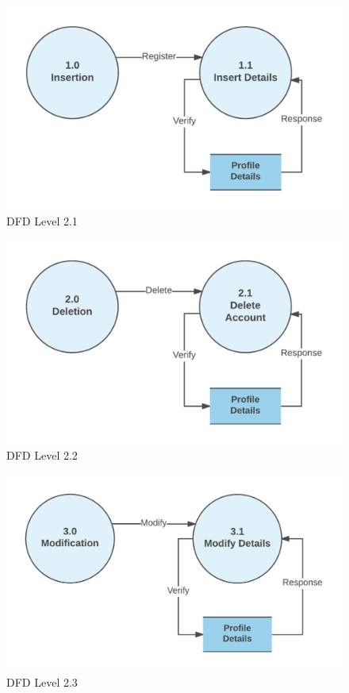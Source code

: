 \documentclass[12pt]{report}
\begin{document}
\begin{figure}[!htb]
    \centering
    \includegraphics[width=.8\textwidth]{df-l2-1.png}
    \caption{DFD Level 2.1}
    \label{fig:dfd l2.1}
\end{figure}

\begin{figure}[!htb]
    \centering
    \includegraphics[width=.8\textwidth]{df-l2-2.png}
    \caption{DFD Level 2.2}
    \label{fig:dfd l2.2}
\end{figure}

\begin{figure}[!htb]
    \centering
    \includegraphics[width=.8\textwidth]{df-l2-3.png}
    \caption{DFD Level 2.3}
    \label{fig:dfd l2.3}
\end{figure}
\end{document}
